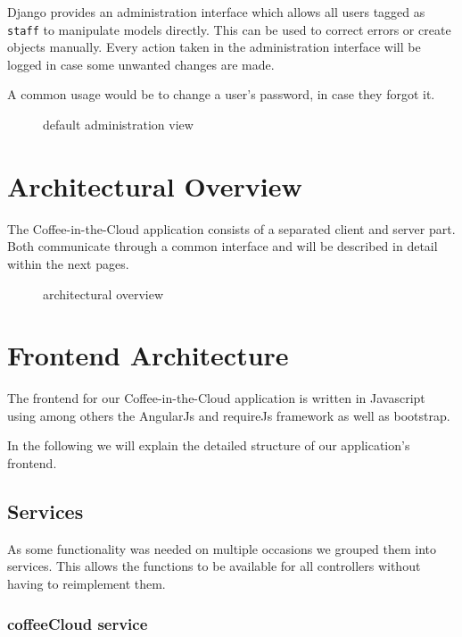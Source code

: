 Django provides an administration interface which allows all users
tagged as \texttt{staff} to manipulate models directly. This can be used
to correct errors or create objects manually. Every action taken in the
administration interface will be logged in case some unwanted changes
are made.

A common usage would be to change a user's password, in case they forgot
it.

\begin{figure}[htbp]
\centering
{}
\caption{default administration view}
\end{figure}

\newpage
\section{Architectural Overview}\label{architectural-overview}

The Coffee-in-the-Cloud application consists of a separated client and
server part. Both communicate through a common interface and will be
described in detail within the next pages.

\begin{figure}[htbp]
\centering
{}
\caption{architectural overview}
\end{figure}

\newpage
\section{Frontend Architecture}\label{frontend-architecture}

The frontend for our Coffee-in-the-Cloud application is written in
Javascript using among others the AngularJs and requireJs framework as
well as bootstrap.

In the following we will explain the detailed structure of our
application's frontend.

\subsection{Services}\label{services}

As some functionality was needed on multiple occasions we grouped them
into services. This allows the functions to be available for all
controllers without having to reimplement them.

\subsubsection{coffeeCloud service}\label{coffeecloud-service}

